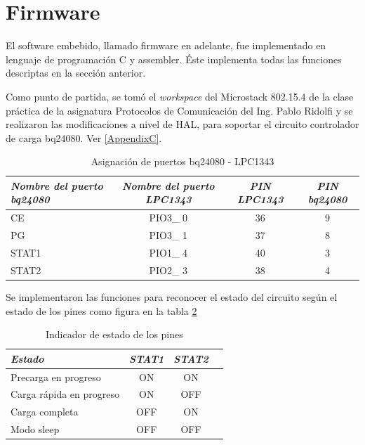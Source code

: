 {\section{Firmware}
\label{sec:firm}
El software embebido, llamado firmware en adelante, fue implementado en lenguaje de programación C y assembler. Éste implementa todas las funciones descriptas en la sección anterior.
 
Como punto de partida, se tomó el \textit{workspace} del Microstack 802.15.4 de la clase práctica de la asignatura Protocolos de Comunicación del Ing. Pablo Ridolfi y se realizaron las modificaciones a nivel de HAL, para soportar el circuito controlador de carga bq24080. Ver \ref{AppendixC}.

\begin{table}[ht]
	\centering
	\caption{Asignación de puertos bq24080 - LPC1343}
	\begin{tabular}{@{} l *3c @{}}    \toprule
		\emph{\textbf{Nombre del puerto bq24080}} & \emph{\textbf{Nombre del puerto LPC1343}} & \emph{\textbf{PIN LPC1343}} & \emph{\textbf{PIN bq24080}}\\
		\midrule
		CE &  PIO3\_ 0 & 36 & 9	\\	
		PG	&  PIO3\_ 1 & 37 & 8\\
		STAT1 &  PIO1\_ 4 & 40 & 3\\
		STAT2 &  PIO2\_ 3 & 38 & 4\\

		\bottomrule
		\hline
	\end{tabular}
	\label{tab:bq}
\end{table}

Se implementaron las funciones para reconocer el estado del circuito según el estado de los pines como figura en la tabla \ref{tab:bq}

\begin{table}[ht]
	\centering
	\caption{Indicador de estado de los pines}
	\begin{tabular}{@{} l *3c @{}}    \toprule
		\emph{\textbf{Estado}} & \emph{\textbf{STAT1}} & \emph{\textbf{STAT2}}\\
		\midrule
		Precarga en progreso &  ON & ON \\	
		Carga rápida en progreso	&  ON & OFF \\
		Carga completa &  OFF & ON \\
		Modo sleep &  OFF & OFF \\

		\bottomrule
		\hline
	\end{tabular}
	\label{tab:bq}
\end{table}

}
